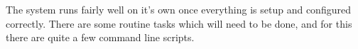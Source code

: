 The system runs fairly well on it's own once everything is setup and configured correctly.  There are some routine tasks which will need to be done, and for this there are quite a few command line scripts.


%
%
%
%
%
%
